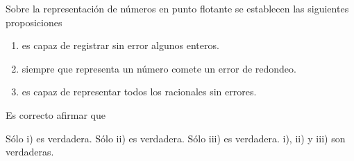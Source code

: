 \begin{pregunta}
\begin{cuerpo}
Sobre la representación de números en punto flotante se establecen las siguientes proposiciones
\begin{enumerate}
\item[i)] es capaz de registrar sin error algunos enteros.
\item[ii)] siempre que representa un número comete un error de redondeo.
\item[iii)] es capaz de representar todos los racionales sin errores.
\end{enumerate}
Es correcto afirmar que
\end{cuerpo}
\begin{multicols}{2}
\begin{alternativas}
{S\'olo i) es verdadera.} %
{Sólo ii) es verdadera.}
{Sólo iii) es verdadera.}
{i), ii) y iii) son verdaderas.}
\end{alternativas}
\end{multicols}
\justificacion{0cm}
\end{pregunta}
